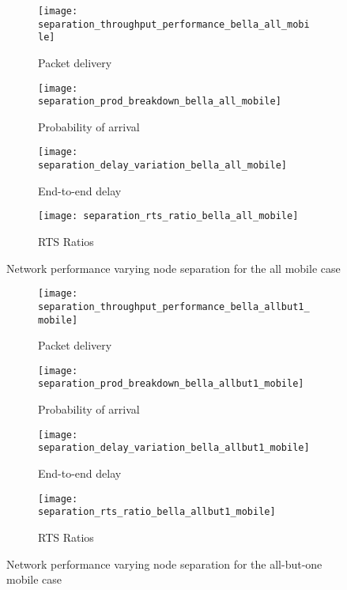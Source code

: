 \begin{figure}[bp!]
	\begin{subfigure}[t]{0.5\textwidth}
		\centering
		\texttt{[image: separation\_throughput\_performance\_bella\_all\_mobile]}
		\caption{Packet delivery}
		\label{fig:separation_throughput_performance_bella_all_mobile}
	\end{subfigure}
	\begin{subfigure}[t]{0.5\textwidth}
		\centering
		\texttt{[image: separation\_prod\_breakdown\_bella\_all\_mobile]}
		\caption{Probability of arrival}
		\label{fig:separation_prod_breakdown_bella_all_mobile}
	\end{subfigure}
	
	\begin{subfigure}[t]{0.5\textwidth}
		\centering
		\texttt{[image: separation\_delay\_variation\_bella\_all\_mobile]}
		\caption{End-to-end delay}
		\label{fig:separation_delay_variation_bella_all_mobile}
	\end{subfigure}
	\begin{subfigure}[t]{0.5\textwidth}
		\centering
		\texttt{[image: separation\_rts\_ratio\_bella\_all\_mobile]}
		\caption{RTS Ratios}
		\label{fig:separation_rts_ratio_bella_all_mobile}
	\end{subfigure}
	\caption{Network performance varying node separation for the all mobile case}
	\label{fig:separation_bella_all_mobile}
\end{figure}


\begin{figure}[tp!]
	\begin{subfigure}[t]{0.5\textwidth}
		\centering
		\texttt{[image: separation\_throughput\_performance\_bella\_allbut1\_mobile]}
		\caption{Packet delivery}
		\label{fig:separation_throughput_performance_bella_allbut1_mobile}
	\end{subfigure}
	\begin{subfigure}[t]{0.5\textwidth}
		\centering
		\texttt{[image: separation\_prod\_breakdown\_bella\_allbut1\_mobile]}
		\caption{Probability of arrival}
		\label{fig:separation_prod_breakdown_bella_allbut1_mobile}
	\end{subfigure}
	
	\begin{subfigure}[t]{0.5\textwidth}
		\centering
		\texttt{[image: separation\_delay\_variation\_bella\_allbut1\_mobile]}
		\caption{End-to-end delay}
		\label{fig:separation_delay_variation_bella_allbut1_mobile}
	\end{subfigure}
	\begin{subfigure}[t]{0.5\textwidth}
		\centering
		\texttt{[image: separation\_rts\_ratio\_bella\_allbut1\_mobile]}
		\caption{RTS Ratios}
		\label{fig:separation_rts_ratio_bella_allbut1_mobile}
	\end{subfigure}
	\caption{Network performance varying node separation for the all-but-one mobile case}
	\label{fig:separation_bella_allbut1_mobile}
\end{figure}

